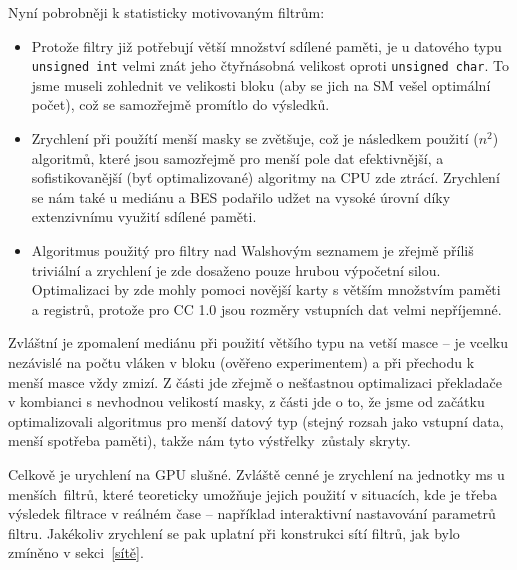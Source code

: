     Nyní pobrobněji k statisticky motivovaným filtrům:
    \begin{itemize}
      \item Protože filtry již potřebují větší množství sdílené paměti, je u datového typu {\tt unsigned int} velmi znát jeho čtyřnásobná velikost oproti {\tt unsigned char}. To jsme museli zohlednit ve velikosti bloku (aby se jich na SM vešel optimální počet), což se samozřejmě promítlo do výsledků.
      \item Zrychlení při použítí menší masky se zvětšuje, což je následkem použití \OOO($n^2$) algoritmů, které jsou samozřejmě pro menší pole dat efektivnější, a sofistikovanější (byť optimalizované) algoritmy na CPU zde ztrácí. Zrychlení se nám také u mediánu a BES podařilo udžet na vysoké úrovní díky extenzivnímu využití sdílené paměti.
      \item Algoritmus použitý pro filtry nad Walshovým seznamem je zřejmě příliš triviální a zrychlení je zde dosaženo pouze hrubou výpočetní silou. Optimalizaci by zde mohly pomoci novější karty s větším množstvím paměti a registrů, protože pro CC 1.0 jsou rozměry vstupních dat velmi nepříjemné.
    \end{itemize}

    Zvláštní je zpomalení mediánu při použití většího typu na vetší masce -- je vcelku nezávislé na počtu vláken v bloku (ověřeno experimentem) a při přechodu k menší masce vždy zmizí. Z části jde zřejmě o nešťastnou optimalizaci překladače v kombianci s nevhodnou velikostí masky, z části jde o to, že jsme od začátku optimalizovali algoritmus pro menší datový typ (stejný rozsah jako vstupní data, menší spotřeba paměti), takže nám tyto \bq výstřelky\eq ~zůstaly skryty.

    \vspace{0.5cm}

    Celkově je urychlení na GPU slušné. Zvláště cenné je zrychlení na jednotky ms u \bq menších\eq ~filtrů, které teoreticky umožňuje jejich použití v situacích, kde je třeba výsledek filtrace v reálném čase -- například interaktivní nastavování parametrů filtru. Jakékoliv zrychlení se pak uplatní při konstrukci sítí filtrů, jak bylo zmíněno v sekci~\ref{sítě}.















